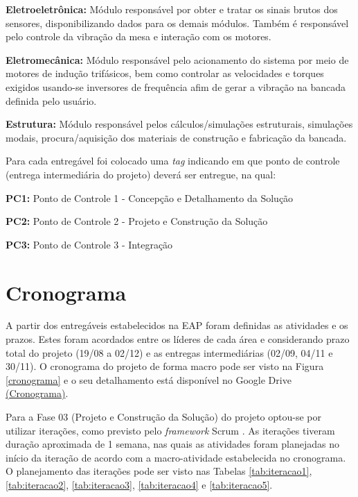 \textbf{Eletroeletrônica:} Módulo responsável por obter e tratar os sinais brutos dos sensores, disponibilizando dados para os demais módulos. Também é responsável pelo controle da vibração da mesa e interação com os motores.

\textbf{Eletromecânica:} Módulo responsável pelo acionamento do sistema por meio de motores de indução trifásicos, bem como controlar as velocidades e torques exigidos usando-se inversores de frequência afim de gerar a vibração na bancada definida pelo usuário.

\textbf{Estrutura:} Módulo responsável pelos cálculos/simulações estruturais, simulações modais, procura/aquisição dos materiais de construção e fabricação da bancada.

Para cada entregável foi colocado uma \textit{tag} indicando em que ponto de controle (entrega intermediária do projeto) deverá ser entregue, na qual:

\indent \textbf{PC1:} Ponto de Controle 1 - Concepção e Detalhamento da Solução

\indent \textbf{PC2:} Ponto de Controle 2 - Projeto e Construção da Solução

\indent \textbf{PC3:} Ponto de Controle 3 - Integração

\section*{Cronograma}

A partir dos entregáveis estabelecidos na EAP foram definidas as atividades e os prazos. Estes foram acordados entre os líderes de 
cada área e considerando prazo total do projeto (19/08 a 02/12) e as entregas intermediárias (02/09, 04/11 e 30/11).
O cronograma do projeto de forma macro pode ser visto na Figura \ref{cronograma} e o seu detalhamento está disponível
no Google Drive \href{https://drive.google.com/file/d/0B28JW3Vcm0jLdElSSGNPcU4yVEU/view?usp=sharing}{(Cronograma)}.

Para a Fase 03 (Projeto e Construção da Solução) do projeto optou-se por utilizar iterações, como previsto pelo 
\textit{framework} Scrum \cite{scrum}.
As iterações tiveram duração aproximada de 1 semana, 
nas quais as atividades foram planejadas no início da iteração de acordo 
com a macro-atividade estabelecida no cronograma. O planejamento das iterações pode ser visto nas Tabelas \ref{tab:iteracao1},
\ref{tab:iteracao2}, \ref{tab:iteracao3}, \ref{tab:iteracao4} e \ref{tab:iteracao5}.

